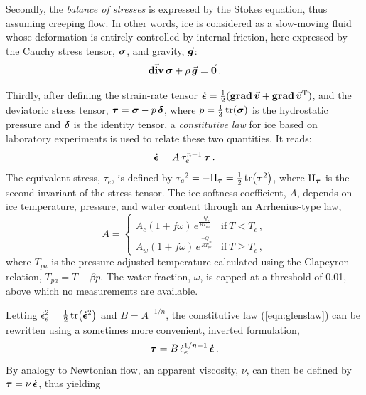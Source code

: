 \documentclass{article}
\newcommand{\vect}[1]{\va*{#1}} %
\newcommand{\tens}[1]{\vb*{#1}} %
\newcommand{\tdiv}[1]{\vect{\mathrm{div}}\,#1}      %
\newcommand{\tgrad}[1]{\tens{\mathrm{grad}}\,#1}    %
\newcommand{\doteps}[0]{\dot{\epsilon}} %
\newcommand{\IDT}[0]{\tens{\delta}}     %
\newcommand{\CST}[0]{\tens{\sigma}}     %
\newcommand{\DST}[0]{\tens{\tau}}       %
\newcommand{\SRT}[0]{\tens{\doteps}}    %
\newcommand{\vv}[0]{\vect{v}}           %
\begin{document}
Secondly, the \emph{balance of stresses} is expressed by the Stokes equation,
thus assuming creeping flow. In other words, ice is considered as a slow-moving
fluid whose deformation is entirely controlled by internal friction, here
expressed by the Cauchy stress tensor, $\CST$, and gravity, $\vect{g}$:
\begin{equation}
    \label{eqn:stressbalance}
    \tdiv{\CST} + \rho\,\vect{g} = \vect{0} \,.
\end{equation}

Thirdly, after defining the strain-rate tensor
${\SRT = \frac{1}{2}(\tgrad{\vv} + \tgrad{\vv}^{\mathrm{T}})}$,
and the deviatoric stress tensor, ${\DST = \CST - p\,\IDT}$,
where $p=\frac{1}{3}\tr(\CST)$ is the hydrostatic pressure and
$\tens{\delta}$ is the identity tensor, a \emph{constitutive law} for ice based
on laboratory experiments is used to relate these two quantities. It reads:
\begin{equation}
    \label{eqn:glenslaw}
    \SRT = A\,\tau_e^{n-1}\,\DST \,.
\end{equation}
The equivalent stress, $\tau_e$, is defined by
${\tau_e}^2 = -\mathrm{II}_{\DST} = \frac{1}{2} \tr(\DST^2)$,
where $\mathrm{II}_{\DST}$ is the second invariant of the stress tensor.
The ice softness coefficient, $A$, depends on ice temperature, pressure, and
water content through an Arrhenius-type law,
\begin{equation}
    A =
    \begin{cases}
        A_c (1+f\omega)\,e^\frac{-Q_c}{RT_{pa}}
            & \text{if}\ T < T_c \,, \\
        A_w (1+f\omega)\,e^\frac{-Q_w}{RT_{pa}}
            & \text{if}\ T \ge T_c \,,
    \end{cases}
\end{equation}
where $T_{pa}$ is the pressure-adjusted temperature calculated using the
Clapeyron relation, ${T_{pa} = T - \beta p}$. The water fraction, $\omega$, is
capped at a threshold of 0.01, above which no measurements are available.

Letting ${\doteps_e}^2 = \frac{1}{2} \tr(\SRT^2)$ and $B=A^{-1/n}$, the
constitutive law (\ref{eqn:glenslaw}) can be rewritten using a sometimes more
convenient, inverted formulation,
\begin{equation}
    \label{eqn:invglenslaw}
    \DST = B\,\doteps_e^{1/n-1}\,\SRT \,.
\end{equation}
By analogy to Newtonian flow, an apparent viscosity, $\nu$, can then be defined
by $\DST = \nu\,\SRT$, thus yielding
\end{document}

